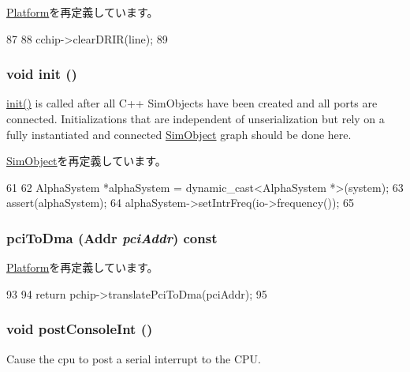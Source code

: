 \hyperlink{classPlatform_a0d98ea2b236bb883fa15d63a59a2ec9e}{Platform}を再定義しています。


\begin{DoxyCode}
87 {
88     cchip->clearDRIR(line);
89 }
\end{DoxyCode}
\hypertarget{classTsunami_a02fd73d861ef2e4aabb38c0c9ff82947}{
\subsubsection[{init}]{\setlength{\rightskip}{0pt plus 5cm}void init ()}}
\label{classTsunami_a02fd73d861ef2e4aabb38c0c9ff82947}
\hyperlink{classTsunami_a02fd73d861ef2e4aabb38c0c9ff82947}{init()} is called after all C++ SimObjects have been created and all ports are connected. Initializations that are independent of unserialization but rely on a fully instantiated and connected \hyperlink{classSimObject}{SimObject} graph should be done here. 

\hyperlink{classSimObject_a02fd73d861ef2e4aabb38c0c9ff82947}{SimObject}を再定義しています。


\begin{DoxyCode}
61 {
62     AlphaSystem *alphaSystem = dynamic_cast<AlphaSystem *>(system);
63     assert(alphaSystem);
64     alphaSystem->setIntrFreq(io->frequency());
65 }
\end{DoxyCode}
\hypertarget{classTsunami_a87078b3d3a28ae134f6736337e90dac3}{
\subsubsection[{pciToDma}]{ pciToDma ({\bf Addr} {\em pciAddr}) const}}
\label{classTsunami_a87078b3d3a28ae134f6736337e90dac3}


\hyperlink{classPlatform_a87078b3d3a28ae134f6736337e90dac3}{Platform}を再定義しています。


\begin{DoxyCode}
93 {
94     return pchip->translatePciToDma(pciAddr);
95 }
\end{DoxyCode}
\hypertarget{classTsunami_a5b278cebc0a62bc2195edf27f059ab1a}{
\subsubsection[{postConsoleInt}]{\setlength{\rightskip}{0pt plus 5cm}void postConsoleInt ()}}
\label{classTsunami_a5b278cebc0a62bc2195edf27f059ab1a}
Cause the cpu to post a serial interrupt to the CPU. 

